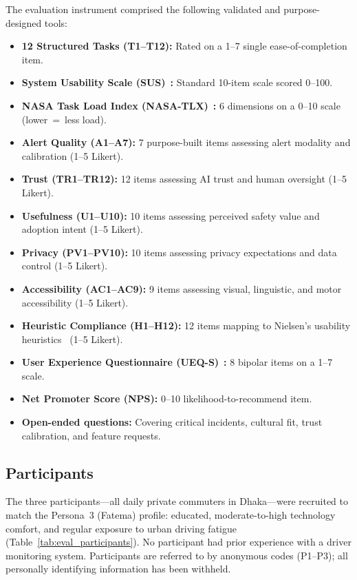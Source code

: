 \documentclass[sigconf]{acmart}
\begin{document}
The evaluation instrument comprised the following validated and purpose-designed tools:
\begin{itemize}
    \item \textbf{12 Structured Tasks (T1--T12):} Rated on a 1--7 single ease-of-completion item.
    \item \textbf{System Usability Scale (SUS)}~\cite{ref15}\textbf{:} Standard 10-item scale scored 0--100.
    \item \textbf{NASA Task Load Index (NASA-TLX)}~\cite{ref16}\textbf{:} 6 dimensions on a 0--10 scale (lower~=~less load).
    \item \textbf{Alert Quality (A1--A7):} 7 purpose-built items assessing alert modality and calibration (1--5 Likert).
    \item \textbf{Trust (TR1--TR12):} 12 items assessing AI trust and human oversight (1--5 Likert).
    \item \textbf{Usefulness (U1--U10):} 10 items assessing perceived safety value and adoption intent (1--5 Likert).
    \item \textbf{Privacy (PV1--PV10):} 10 items assessing privacy expectations and data control (1--5 Likert).
    \item \textbf{Accessibility (AC1--AC9):} 9 items assessing visual, linguistic, and motor accessibility (1--5 Likert).
    \item \textbf{Heuristic Compliance (H1--H12):} 12 items mapping to Nielsen's usability heuristics~\cite{ref27} (1--5 Likert).
    \item \textbf{User Experience Questionnaire (UEQ-S)}~\cite{ref17}\textbf{:} 8 bipolar items on a 1--7 scale.
    \item \textbf{Net Promoter Score (NPS):} 0--10 likelihood-to-recommend item.
    \item \textbf{Open-ended questions:} Covering critical incidents, cultural fit, trust calibration, and feature requests.
\end{itemize}

\subsection{Participants}

The three participants---all daily private commuters in Dhaka---were recruited to match the Persona~3 (Fatema) profile: educated, moderate-to-high technology comfort, and regular exposure to urban driving fatigue (Table~\ref{tab:eval_participants}). No participant had prior experience with a driver monitoring system. Participants are referred to by anonymous codes (P1--P3); all personally identifying information has been withheld.
\end{document}
